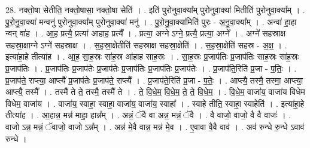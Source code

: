 \documentclass[17pt]{extarticle}
\begin{document}
28. नक्तो॒षा सेतीति॒ नक्तो॒षासा॒ नक्तो॒षा सेति॑ । . इति॑ पुरोनुवा॒क्या᳚म् पुरोनुवा॒क्या॑ मितीति॑ पुरोनुवा॒क्या᳚म् । . पु॒रो॒नु॒वा॒क्या॑ मन्वनु॑ पुरोनुवा॒क्या᳚म् पुरोनुवा॒क्या॑ मनु॑ । . पु॒रो॒नु॒वा॒क्या॑मिति॑ पुरः - अ॒नु॒वा॒क्या᳚म् । . अन्वा॑ हा॒हा न्वन् वा॑ह । . आ॒ह॒ प्रत्यै॒ प्रत्या॑ आहाह॒ प्रत्यै᳚ । . प्रत्या॒ अग्ने ऽग्ने॒ प्रत्यै॒ प्रत्या॒ अग्ने᳚ । . अग्ने॑ सहस्राक्ष सहस्रा॒क्षाग्ने ऽग्ने॑ सहस्राक्ष । . स॒ह॒स्रा॒क्षेतीति॑ सहस्राक्ष सहस्रा॒क्षेति॑ । . स॒ह॒स्रा॒क्षेति॑ सहस्र - अ॒क्ष॒ । . इत्या॑हा॒हे तीत्या॑ह । . आ॒ह॒ सा॒ह॒स्रः सा॑ह॒स्र आ॑हाह साह॒स्रः । . सा॒ह॒स्रः प्र॒जाप॑तिः प्र॒जाप॑तिः साह॒स्रः सा॑ह॒स्रः प्र॒जाप॑तिः । . प्र॒जाप॑तिः प्र॒जाप॑तेः प्र॒जाप॑तेः प्र॒जाप॑तिः प्र॒जाप॑तिः प्र॒जाप॑तेः । . प्र॒जाप॑ति॒रिति॑ प्र॒जा - प॒तिः॒ । . प्र॒जाप॑ते॒ राप्त्या॒ आप्त्यै᳚ प्र॒जाप॑तेः प्र॒जाप॑ते॒ राप्त्यै᳚ । . प्र॒जाप॑ते॒रिति॑ प्र॒जा - प॒तेः॒ । . आप्त्यै॒ तस्मै॒ तस्मा॒ आप्त्या॒ आप्त्यै॒ तस्मै᳚ । . तस्मै॑ ते ते॒ तस्मै॒ तस्मै॑ ते । . ते॒ वि॒धे॒म॒ वि॒धे॒म॒ ते॒ ते॒ वि॒धे॒म॒ । . वि॒धे॒म॒ वाजा॑य॒ वाजा॑य विधेम विधेम॒ वाजा॑य । . वाजा॑य॒ स्वाहा॒ स्वाहा॒ वाजा॑य॒ वाजा॑य॒ स्वाहा᳚ । . स्वाहे तीति॒ स्वाहा॒ स्वाहेति॑ । . इत्या॑हा॒हे तीत्या॑ह । . आ॒हान्न॒ मन्न॑ माहा॒ हान्न᳚म् । . अन्नं॒ ॅवै वा अन्न॒ मन्नं॒ ॅवै । . वै वाजो॒ वाजो॒ वै वै वाजः॑ । . वाजो ऽन्न॒ मन्नं॒ ॅवाजो॒ वाजो ऽन्न᳚म् । . अन्न॑ मे॒वै वान्न॒ मन्न॑ मे॒व । . ए॒वावा वै॒वै वाव॑ । . अव॑ रुन्धे रु॒न्धे ऽवाव॑ रुन्धे । \newline
\end{document}
